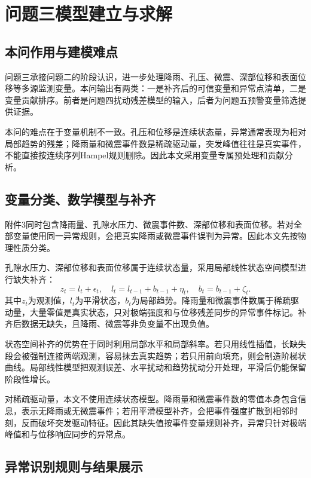 \chapter{问题三模型建立与求解}

\section{本问作用与建模难点}

问题三承接问题二的阶段认识，进一步处理降雨、孔压、微震、深部位移和表面位移等多源监测变量。本问输出有两类：一是补齐后的可信变量和异常点清单，二是变量贡献排序。前者是问题四扰动残差模型的输入，后者为问题五预警变量筛选提供证据。

本问的难点在于变量机制不一致。孔压和位移是连续状态量，异常通常表现为相对局部趋势的残差；降雨量和微震事件数是稀疏驱动量，突发峰值往往是真实事件，不能直接按连续序列Hampel规则删除。因此本文采用变量专属预处理和贡献分析。

\section{变量分类、数学模型与补齐}

附件3同时包含降雨量、孔隙水压力、微震事件数、深部位移和表面位移。若对全部变量使用同一异常规则，会把真实降雨或微震事件误判为异常。因此本文先按物理性质分类。

孔隙水压力、深部位移和表面位移属于连续状态量，采用局部线性状态空间模型进行缺失补齐：
\begin{equation}
  z_t=l_t+\epsilon_t,\quad
  l_t=l_{t-1}+b_{t-1}+\eta_t,\quad
  b_t=b_{t-1}+\zeta_t .
\end{equation}
其中$z_t$为观测值，$l_t$为平滑状态，$b_t$为局部趋势。降雨量和微震事件数属于稀疏驱动量，大量零值是真实状态，只对极端强度和与位移残差同步的异常事件标记。补齐后数据无缺失，且降雨、微震等非负变量不出现负值。

状态空间补齐的优势在于同时利用局部水平和局部斜率。若只用线性插值，长缺失段会被强制连接两端观测，容易抹去真实趋势；若只用前向填充，则会制造阶梯状曲线。局部线性模型把观测误差、水平扰动和趋势扰动分开处理，平滑后仍能保留阶段性增长。

对稀疏驱动量，本文不使用连续状态模型。降雨量和微震事件数的零值本身包含信息，表示无降雨或无微震事件；若用平滑模型补齐，会把事件强度扩散到相邻时刻，反而破坏突发驱动特征。因此其缺失值按事件变量规则补齐，异常只针对极端峰值和与位移响应同步的异常点。

\section{异常识别规则与结果展示}

